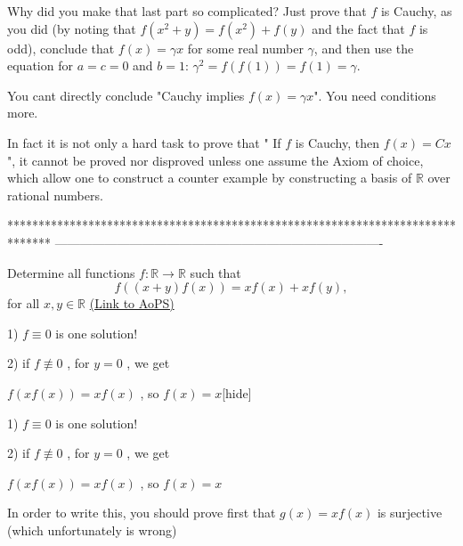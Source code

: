 \begin{solution}
	\begin{tcolorbox}Why did you make that last part so complicated? Just prove that $f$ is Cauchy, as you did (by noting that $f(x^2+y) = f(x^2)+f(y)$ and the fact that $f$ is odd), conclude that $f(x) = \gamma x$ for some real number $\gamma$, and then use the equation for $a = c = 0$ and $b = 1$: $\gamma^2 = f(f(1)) = f(1) = \gamma$.\end{tcolorbox}
You cant directly conclude "Cauchy implies $f(x)=\gamma x$". You need conditions more.
\end{solution}



\begin{solution}
	In fact it is not only a hard task to prove that  " If $f$ is Cauchy, then $f(x)=Cx$ ", it cannot be proved nor disproved unless one assume the Axiom of choice, which allow one to construct a counter example by constructing a basis of $\mathbb{R}$ over rational numbers.
\end{solution}
*******************************************************************************
-------------------------------------------------------------------------------

\begin{problem}
	Determine all functions $f : \mathbb{R} \to \mathbb{R}$ such that \[  f((x+y)f(x))=xf(x)+xf(y) ,\] for all $x,y \in \mathbb{R}$
	\flushright \href{https://artofproblemsolving.com/community/c6h610536}{(Link to AoPS)}
\end{problem}



\begin{solution}1) $f\equiv 0$ is one solution!

2) if $f\not\equiv 0$ , for $y=0$ , we get

$f(xf(x))=xf(x)$ , so $f(x)=x$[\/hide]
\end{solution}



\begin{solution}
	\begin{tcolorbox}1) $f\equiv 0$ is one solution!

2) if $f\not\equiv 0$ , for $y=0$ , we get

$f(xf(x))=xf(x)$ , so $f(x)=x$\end{tcolorbox}
In order to write this, you should prove first that $g(x)=xf(x)$ is surjective (which unfortunately is wrong)
\end{solution}




